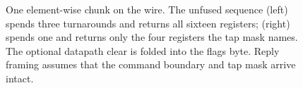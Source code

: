 \begin{figure}[t]
  \centering
  \resizebox{\columnwidth}{!}{}
  \caption{One element-wise chunk on the wire. The unfused sequence (left)
  spends three turnarounds and returns all sixteen registers; 
  (right) spends one and returns only the four registers the tap mask names.
  The optional datapath clear is folded into the flags byte. Reply framing
  assumes that the command boundary and tap mask arrive intact.}
  \label{fig:exec}
\end{figure}
